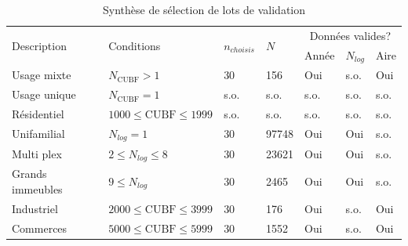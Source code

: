         \begin{table}[ht]
            \centering
            \caption{Synthèse de sélection de lots de validation}
            \label{tab:sampling-strata-description}
            \begin{tabular}{m{4.5cm}                m{4.25cm}                          m{0.75cm}                     m{0.75cm}m{1cm} m{1cm}  m{1cm}}
                \hline
                \multirow{2}{4.5cm}{Description}    & \multirow{2}{4cm}{Conditions}        & \multirow{2}{0.75cm}{$n_{choisis}$}     & \multirow{2}{1cm}{$N$}    & \multicolumn{3}{c}{Données valides?} \\ 
                                                    &                                       &                                        &                           & Année & $N_{log}$ & Aire \\\hline
                Usage mixte                         & $N_{\text{CUBF}}>1$                  & 30                                    & 156                       & Oui   & s.o.       & Oui \\
                Usage unique                        & $N_{\text{CUBF}}=1$                  & s.o.                                    & s.o.                       & s.o.   & s.o.       & s.o. \\
                \quad Résidentiel                   & $1000 \leq \text{CUBF}\leq 1999$     & s.o.                                   & s.o.                       & s.o.   & s.o.       & s.o. \\
                \qquad Unifamilial                  & $N_{log}=1$                          & 30                                   & 97748                     & Oui   & Oui       & s.o. \\
                \qquad Multi plex                   & $ 2 \leq N_{log}\leq 8 $              & 30                                    & 23621                     & Oui   & Oui       & s.o. \\
                \qquad Grands immeubles                 & $ 9 \leq N_{log}$                     & 30                                    & 2465                      & Oui   & Oui       & s.o. \\
                \quad Industriel                    & $2000 \leq\text{CUBF}\leq 3999$     & 30                                     & 176                       & Oui   & s.o.       & Oui \\
                \quad Commerces                     & $5000 \leq \text{CUBF}\leq 5999$     & 30                                     & 1552                      & Oui   & s.o.       & Oui \\

\end{tabular}
\end{table}
